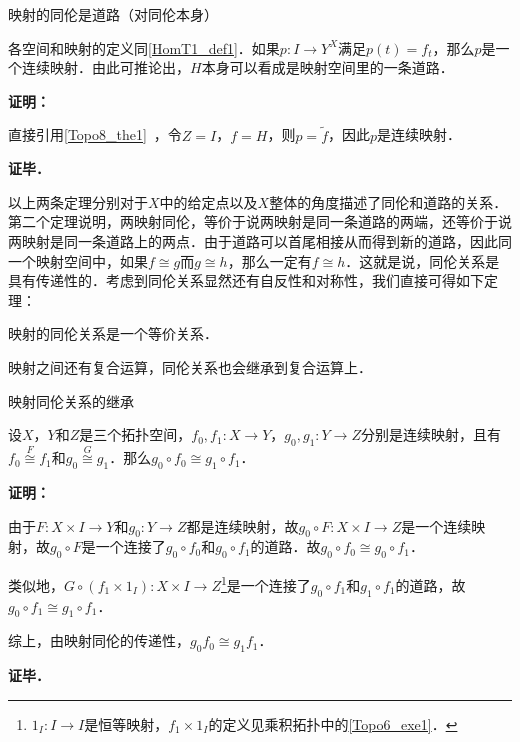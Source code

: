 \begin{theorem}{映射的同伦是道路（对同伦本身）}\label{HomT1_the1}

各空间和映射的定义同\autoref{HomT1_def1}．如果$p:I\rightarrow Y^X$满足$p(t)=f_t$，那么$p$是一个连续映射．由此可推论出，$H$本身可以看成是映射空间里的一条道路．

\end{theorem}

\textbf{证明：}

直接引用\autoref{Topo8_the1}~，令$Z=I$，$f=H$，则$p=\widetilde{f}$，因此$p$是连续映射．

\textbf{证毕．}

以上两条定理分别对于$X$中的给定点以及$X$整体的角度描述了同伦和道路的关系．第二个定理说明，两映射同伦，等价于说两映射是同一条道路的两端，还等价于说两映射是同一条道路上的两点．由于道路可以首尾相接从而得到新的道路，因此同一个映射空间中，如果$f\cong g$而$g\cong h$，那么一定有$f\cong h$．这就是说，同伦关系是具有传递性的．考虑到同伦关系显然还有自反性和对称性，我们直接可得如下定理：

\begin{theorem}{}
映射的同伦关系是一个等价关系．
\end{theorem}

映射之间还有复合运算，同伦关系也会继承到复合运算上．

\begin{theorem}{映射同伦关系的继承}

设$X$，$Y$和$Z$是三个拓扑空间，$f_0, f_1:X\rightarrow Y$，$g_0, g_1:Y\rightarrow Z$分别是连续映射，且有$f_0\overset{F}{\cong}f_1$和$g_0\overset{G}{\cong}g_1$．那么$g_0\circ f_0\cong g_1\circ f_1$．

\end{theorem}

\textbf{证明：}

由于$F:X\times I\rightarrow Y$和$g_0:Y\rightarrow Z$都是连续映射，故$g_0\circ F:X\times I\rightarrow Z$是一个连续映射，故$g_0\circ F$是一个连接了$g_0\circ f_0$和$g_0\circ f_1$的道路．故$g_0\circ f_0\cong g_0\circ f_1$．

类似地，$G\circ(f_1\times 1_I):X\times I\rightarrow Z$\footnote{$1_I:I\rightarrow I$是恒等映射，$f_1\times 1_I$的定义见乘积拓扑中的\autoref{Topo6_exe1}．}是一个连接了$g_0\circ f_1$和$g_1\circ f_1$的道路，故$g_0\circ f_1\cong g_1\circ f_1$．

综上，由映射同伦的传递性，$g_0f_0\cong g_1f_1$．

\textbf{证毕．}

